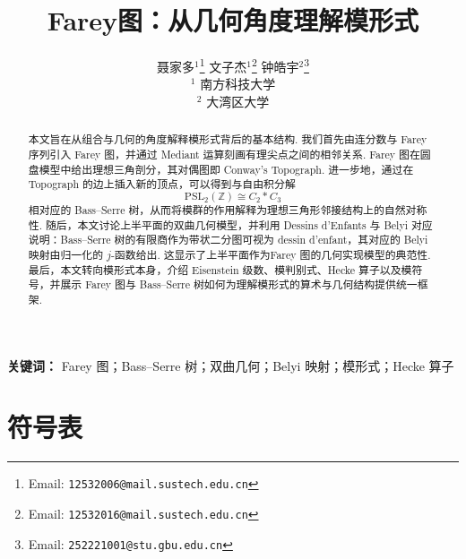 \documentclass[10pt,UTF8]{ctexart}
\title{Farey图：从几何角度理解模形式}
\author{
  聂家多$^1$\thanks{Email: \texttt{12532006@mail.sustech.edu.cn}} \quad 
  文子杰$^1$\thanks{Email: \texttt{12532016@mail.sustech.edu.cn}} \quad 
  钟皓宇$^2$\thanks{Email: \texttt{252221001@stu.gbu.edu.cn}} \\
  \vspace{0.2cm}
  \small $^1$ 南方科技大学 \\
  \small $^2$ 大湾区大学
}
\date{}
\theoremstyle{definition}
\theoremstyle{remark}
\begin{document}
\maketitle

\begin{abstract}
本文旨在从组合与几何的角度解释模形式背后的基本结构. 我们首先由连分数与 Farey 序列引入 Farey 图，并通过 Mediant 运算刻画有理尖点之间的相邻关系. Farey 图在圆盘模型中给出理想三角剖分，其对偶图即 Conway's Topograph. 进一步地，通过在 Topograph 的边上插入新的顶点，可以得到与自由积分解
\[
\mathrm{PSL}_2(\mathbb Z)\cong C_2*C_3
\]
相对应的 Bass--Serre 树，从而将模群的作用解释为理想三角形邻接结构上的自然对称性. 随后，本文讨论上半平面的双曲几何模型，并利用 Dessins d'Enfants 与 Belyi 对应说明：Bass--Serre 树的有限商作为带状二分图可视为 dessin d'enfant，其对应的 Belyi 映射由归一化的 \(j\)-函数给出. 这显示了上半平面作为Farey 图的几何实现模型的典范性. 
最后，本文转向模形式本身，介绍 Eisenstein 级数、模判别式、Hecke 算子以及模符号，并展示 Farey 图与 Bass--Serre 树如何为理解模形式的算术与几何结构提供统一框架.
\end{abstract}
\noindent\textbf{关键词：}
Farey 图；Bass--Serre 树；双曲几何；Belyi 映射；模形式；Hecke 算子



\tableofcontents




\section*{符号表}
\end{document}
